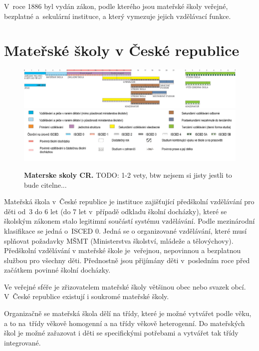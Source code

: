 		V roce 1886 byl vydán zákon, podle kterého jsou mateřské školy veřejné, bezplatné a sekulární instituce, a který vymezuje jejich vzdělávací funkce.



	\section{Mateřské školy v České republice}
\begin{figure} [h!]
			\includegraphics[width=1.0\linewidth]{fotky/msCR.png} \\
			\includegraphics[width=1.0\linewidth]{fotky/msVysvetlivky.png}
			\caption{ \textbf{Materske skoly CR.}
				TODO: 1-2 vety, btw nejsem si jisty jestli to bude citelne...
			}
			\label{obr:msCR}
		\end{figure}

		Mateřská škola v České republice je instituce zajišťující předškolní vzdělávání pro děti od 3 do 6 let (do 7 let v případě odkladu školní docházky), které se školským zákonem stalo legitimní součástí systému vzdělávání. Podle mezinárodní klasifikace se jedná o ISCED 0. Jedná se o organizované vzdělávání, které musí splňovat požadavky MŠMT (Ministerstva školství, mládeže a tělovýchovy). Předškolní vzdělávání v mateřské škole je veřejnou, nepovinnou a bezplatnou službou pro všechny děti. Přednostně jsou přijímány děti v posledním roce před začátkem povinné školní docházky. 

		

		Ve veřejné sféře je zřizovatelem mateřské školy většinou obec nebo svazek obcí. V České republice existují i soukromé mateřské školy.

		Organizačně se mateřská škola dělí na třídy, které je možné vytvářet podle věku, a to na třídy věkově homogenní a na třídy věkově heterogenní. Do mateřských škol je možné zařazovat i děti se specifickými potřebami a vytvářet tak třídy integrované. 

